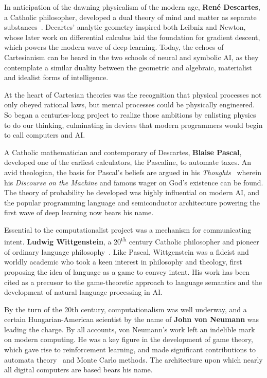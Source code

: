 \documentclass[sigplan,nonacm]{acmart}\settopmatter{printfolios=false,printccs=false,printacmref=false}
\begin{document}
In anticipation of the dawning physicalism of the modern age, \textbf{Ren\'e Descartes}, a Catholic philosopher, developed a dual theory of mind and matter as separate substances~\cite{descartes1641meditationes}. Decartes' analytic geometry inspired both Leibniz and Newton, whose later work on differential calculus laid the foundation for gradient descent, which powers the modern wave of deep learning. Today, the echoes of Cartesianism can be heard in the two schools of neural and symbolic AI, as they contemplate a similar duality between the geometric and algebraic, materialist and idealist forms of intelligence.

At the heart of Cartesian theories was the recognition that physical processes not only obeyed rational laws, but mental processes could be physically engineered. So began a centuries-long project to realize those ambitions by enlisting physics to do our thinking, culminating in devices that modern programmers would begin to call computers and AI.

A Catholic mathematician and contemporary of Descartes, \textbf{Blaise Pascal}, developed one of the earliest calculators, the Pascaline, to automate taxes. An avid theologian, the basis for Pascal's beliefs are argued in his \textit{Thoughts}~\cite{pascal1670pensees} wherein his \textit{Discourse on the Machine} and famous wager on God's existence can be found. The theory of probability he developed was highly influential on modern AI, and the popular programming language and semiconductor architecture powering the first wave of deep learning now bears his name.

Essential to the computationalist project was a mechanism for communicating intent. \textbf{Ludwig Wittgenstein}, a 20\textsuperscript{th} century Catholic philosopher and pioneer of ordinary language philosophy~\cite{wittgenstein1929some}. Like Pascal, Wittgenstein was a fideist and worldly academic who took a keen interest in philosophy and theology, first proposing the idea of language as a game to convey intent. His work has been cited as a precusor to the game-theoretic approach to language semantics and the development of natural language processing in AI.

By the turn of the 20th century, computationalism was well underway, and a certain Hungarian-American scientist by the name of \textbf{John von Neumann} was leading the charge. By all accounts, von Neumann's work left an indelible mark on modern computing. He was a key figure in the development of game theory, which gave rise to reinforcement learning, and made significant contributions to automata theory~\cite{von2017general} and Monte Carlo methods. The architecture upon which nearly all digital computers are based bears his name.
\end{document}
